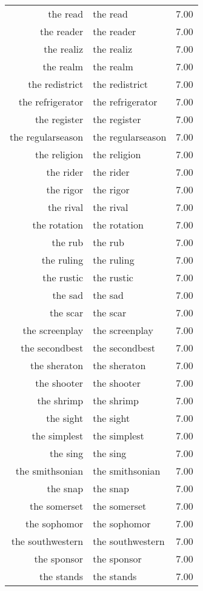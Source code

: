 \begin{table}[ht]
\begin{tabular}{rlr}
  the read & the read & 7.00 \\ 
  the reader & the reader & 7.00 \\ 
  the realiz & the realiz & 7.00 \\ 
  the realm & the realm & 7.00 \\ 
  the redistrict & the redistrict & 7.00 \\ 
  the refrigerator & the refrigerator & 7.00 \\ 
  the register & the register & 7.00 \\ 
  the regularseason & the regularseason & 7.00 \\ 
  the religion & the religion & 7.00 \\ 
  the rider & the rider & 7.00 \\ 
  the rigor & the rigor & 7.00 \\ 
  the rival & the rival & 7.00 \\ 
  the rotation & the rotation & 7.00 \\ 
  the rub & the rub & 7.00 \\ 
  the ruling & the ruling & 7.00 \\ 
  the rustic & the rustic & 7.00 \\ 
  the sad & the sad & 7.00 \\ 
  the scar & the scar & 7.00 \\ 
  the screenplay & the screenplay & 7.00 \\ 
  the secondbest & the secondbest & 7.00 \\ 
  the sheraton & the sheraton & 7.00 \\ 
  the shooter & the shooter & 7.00 \\ 
  the shrimp & the shrimp & 7.00 \\ 
  the sight & the sight & 7.00 \\ 
  the simplest & the simplest & 7.00 \\ 
  the sing & the sing & 7.00 \\ 
  the smithsonian & the smithsonian & 7.00 \\ 
  the snap & the snap & 7.00 \\ 
  the somerset & the somerset & 7.00 \\ 
  the sophomor & the sophomor & 7.00 \\ 
  the southwestern & the southwestern & 7.00 \\ 
  the sponsor & the sponsor & 7.00 \\ 
  the stands & the stands & 7.00 \\ 

\end{tabular}
\end{table}

